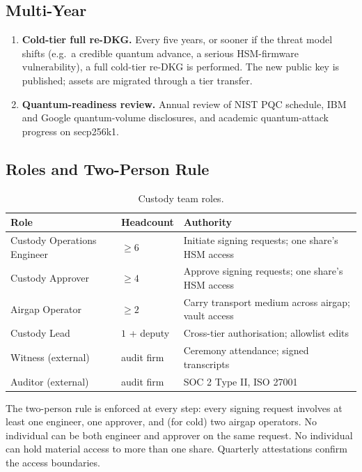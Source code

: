 \subsection{Multi-Year}

\begin{enumerate}[nosep]
\item \textbf{Cold-tier full re-DKG.} Every five years, or sooner if
the threat model shifts (e.g.\ a credible quantum advance, a serious
HSM-firmware vulnerability), a full cold-tier re-DKG is performed.
The new public key is published; assets are migrated through a tier
transfer.
\item \textbf{Quantum-readiness review.} Annual review of NIST PQC
schedule, IBM and Google quantum-volume disclosures, and academic
quantum-attack progress on secp256k1.
\end{enumerate}

\subsection{Roles and Two-Person Rule}

\begin{table}[h]
\centering
\small
\begin{tabular}{p{3.5cm}p{4cm}p{6.5cm}}
\toprule
\textbf{Role} & \textbf{Headcount} & \textbf{Authority} \\
\midrule
Custody Operations Engineer &
$\geq 6$ &
Initiate signing requests; one share's HSM access \\
Custody Approver &
$\geq 4$ &
Approve signing requests; one share's HSM access \\
Airgap Operator &
$\geq 2$ &
Carry transport medium across airgap; vault access \\
Custody Lead &
$1$ + deputy &
Cross-tier authorisation; allowlist edits \\
Witness (external) &
audit firm &
Ceremony attendance; signed transcripts \\
Auditor (external) &
audit firm &
SOC 2 Type II, ISO 27001 \\
\bottomrule
\end{tabular}
\caption{Custody team roles.}
\label{tab:roles}
\end{table}

The two-person rule is enforced at every step: every signing request
involves at least one engineer, one approver, and (for cold) two
airgap operators. No individual can be both engineer and approver
on the same request. No individual can hold material access to more
than one share. Quarterly attestations confirm the access boundaries.

